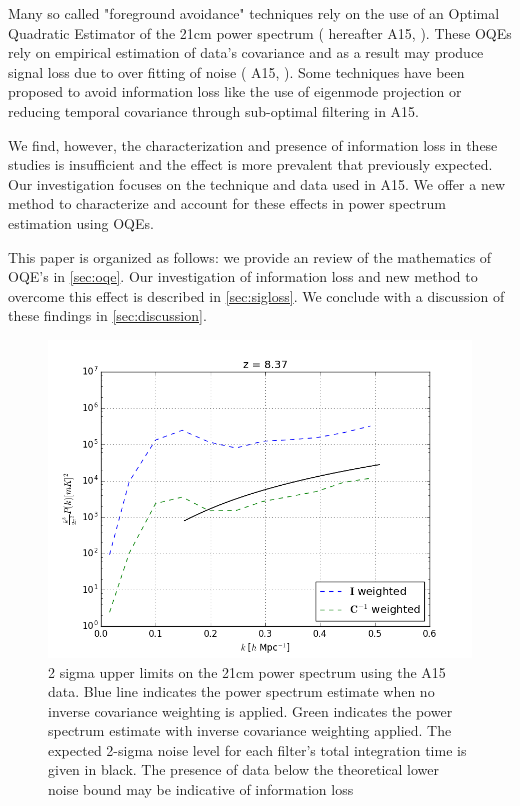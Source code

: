 \documentclass[preprint2,hidelinks]{emulateapj}
\begin{document}
{ Many so called "foreground avoidance" techniques rely on the use of 
 an Optimal Quadratic Estimator of the 21cm power spectrum (\citealt{ali_et_al2015} hereafter A15, 
 \citealt{liu_tegmark2011,dillon_et_al2013a,
 dillon_et_al2015,liu_et_al2014a,
 liu_et_al2014b,trott_et_al2012}). These OQEs rely on empirical estimation of data's covariance and as a result may produce signal loss due to over fitting of noise ( A15, \citet{dillon_et_al2015,switzer_liu2014}). Some techniques have been proposed to avoid information loss like the use of eigenmode projection \citep{dillon_et_al2015} or reducing temporal covariance through sub-optimal filtering in A15. 
 
 We find, however, the characterization and presence of information loss in these studies is insufficient and the effect is more prevalent that previously expected. Our investigation focuses on the technique and data used in A15. We offer a new method to characterize and account for these effects in power spectrum estimation using OQEs.


This paper is organized as follows: we provide an review of the mathematics of OQE's in \autoref{sec:oqe}. Our investigation of information loss and new method to overcome this effect is described in \autoref{sec:sigloss}. We conclude with a discussion of these findings in \autoref{sec:discussion}.
}


\begin{figure}[t]
\centering
\includegraphics[width=.45\textwidth]{ali_upperlims.png}
\caption{2 sigma upper limits on the 21cm power spectrum using the A15 data. Blue line indicates the power spectrum estimate when no inverse covariance weighting is applied. Green indicates the power spectrum estimate with inverse covariance weighting applied. The expected 2-sigma noise level for each filter's total integration time is given in black. The presence of data below the theoretical lower noise bound may be indicative of information loss \label{fig:ali_pi_vs_pc}}
\end{figure}
\end{document}
